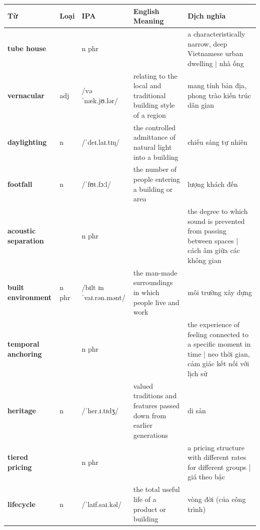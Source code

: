 \separator


\vspace{0.8em}
\begin{center}
\renewcommand{\arraystretch}{1.65}
\begin{tabularx}{\textwidth}{|V{0.22\textwidth}|C{0.07\textwidth}|I{0.20\textwidth}|Y|V{0.18\textwidth}|}
\hline
{}
\textbf{Từ} & \textbf{Loại} & \textbf{IPA} & \textbf{English Meaning} & \textbf{Dịch nghĩa} \\
\hline
\textbf{tube house} & & n phr & & a characteristically narrow, deep Vietnamese urban dwelling | nhà ống \\ \hline
\textbf{vernacular} & adj & /vəˈnæk.jʊ.lər/ & relating to the local and traditional building style of a region & mang tính bản địa, phong trào kiến trúc dân gian \\ \hline
\textbf{daylighting} & n & /ˈdeɪ.laɪ.tɪŋ/ & the controlled admittance of natural light into a building & chiếu sáng tự nhiên \\ \hline
\textbf{footfall} & n & /ˈfʊt.fɔːl/ & the number of people entering a building or area & lượng khách đến \\ \hline
\textbf{acoustic separation} & & n phr & & the degree to which sound is prevented from passing between spaces | cách âm giữa các không gian \\ \hline
\textbf{built environment} & n phr & /bɪlt ɪnˈvaɪ.rən.mənt/ & the man-made surroundings in which people live and work & môi trường xây dựng \\ \hline
\textbf{temporal anchoring} & & n phr & & the experience of feeling connected to a specific moment in time | neo thời gian, cảm giác kết nối với lịch sử \\ \hline
\textbf{heritage} & n & /ˈher.ɪ.tɪdʒ/ & valued traditions and features passed down from earlier generations & di sản \\ \hline
\textbf{tiered pricing} & & n phr & & a pricing structure with different rates for different groups | giá theo bậc \\ \hline
\textbf{lifecycle} & n & /ˈlaɪf.saɪ.kəl/ & the total useful life of a product or building & vòng đời (của công trình) \\ \hline
\end{tabularx}
\end{center}

\newpage

